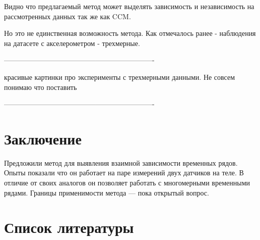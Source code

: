 \documentclass[12pt, twoside]{article}
\begin{document}
Видно что предлагаемый метод может выделять зависимость и независимость на рассмотренных данных так же как   CCM.

Но это не единственная возможность метода. Как отмечалось ранее - наблюдения на датасете с акселерометром - трехмерные.

----------------------------------------------------------------

красивые картинки про эксперименты с трехмерными данными. Не совсем понимаю что поставить

----------------------------------------------------------------

\section{Заключение}

Предложили метод для выявления взаимной зависимости временных рядов. Опыты показали что он работает на паре измерений двух датчиков на теле. В отличие от своих аналогов он позволяет работать с многомерными временными рядами. Границы применимости метода --- пока открытый вопрос.


\section{Список литературы}


\end{document}
